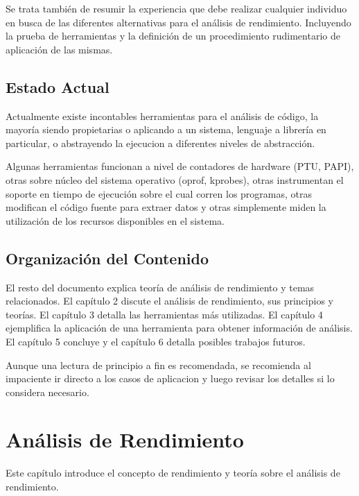 \documentclass[a4paper]{report}
\begin{document}
\bigskip

Se trata tambi\'en de resumir la experiencia que debe realizar cualquier
individuo en busca de las diferentes alternativas para el an\'alisis de
rendimiento. Incluyendo la prueba de herramientas y la definici\'on de un
procedimiento rudimentario de aplicaci\'on de las mismas.

\section{Estado Actual}

Actualmente existe incontables herramientas para el an\'alisis de c\'odigo, la
mayor\'ia siendo propietarias o aplicando a un sistema, lenguaje a librer\'ia
en particular, o abstrayendo la ejecucion a diferentes niveles de
abstracci\'on.

\bigskip

Algunas herramientas funcionan a nivel de contadores de hardware (PTU, PAPI),
otras sobre n\'ucleo del sistema operativo (oprof, kprobes), otras
instrumentan el soporte en tiempo de ejecuci\'on sobre el cual corren los
programas, otras modifican el c\'odigo fuente para extraer datos y otras
simplemente miden la utilizaci\'on de los recursos disponibles en el sistema.

\section{Organizaci\'on del Contenido}

El resto del documento explica teor\'ia de an\'alisis de rendimiento y temas
relacionados. El cap\'itulo 2 discute el an\'alisis de rendimiento, sus
principios y teor\'ias. El cap\'itulo 3 detalla las herramientas m\'as
utilizadas. El cap\'itulo 4 ejemplifica la aplicaci\'on de una herramienta
para obtener informaci\'on de an\'alisis. El cap\'itulo 5 concluye y el
cap\'itulo 6 detalla posibles trabajos futuros.

\bigskip

Aunque una lectura de principio a fin es recomendada, se recomienda al
impaciente ir directo a los casos de aplicacion y luego revisar los detalles
si lo considera necesario.

\chapter{An\'alisis de Rendimiento}

Este cap\'itulo introduce el concepto de rendimiento y teor\'ia sobre el
an\'alisis de rendimiento.
\end{document}
